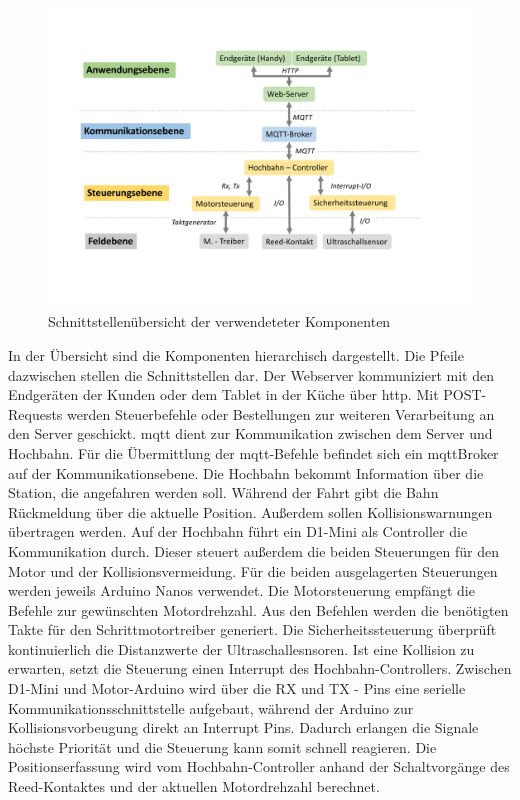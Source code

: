 \begin{figure}[h]
	\centering
	\includegraphics[width=17cm]{schnittstellen.pdf}
	\caption{Schnittstellenübersicht der verwendeteter Komponenten}
	\label{pic:schnittstellen}
\end{figure}


In der Übersicht sind die Komponenten hierarchisch dargestellt. Die Pfeile dazwischen stellen die Schnittstellen dar. Der Webserver kommuniziert mit den Endgeräten der Kunden oder dem Tablet in der Küche über \acrshort{http}. Mit POST-Requests werden Steuerbefehle oder Bestellungen zur weiteren Verarbeitung an den Server geschickt.
\acrshort{mqtt} dient zur Kommunikation zwischen dem Server und Hochbahn. Für die Übermittlung der \acrshort{mqtt}-Befehle  befindet sich ein \acrshort{mqttBroker} auf der Kommunikationsebene. Die Hochbahn bekommt Information über die Station, die angefahren werden soll. Während der Fahrt gibt die Bahn Rückmeldung über die aktuelle Position. Außerdem sollen Kollisionswarnungen übertragen werden. Auf der Hochbahn führt ein D1-Mini als Controller die Kommunikation durch. Dieser steuert außerdem die beiden Steuerungen für den Motor und der Kollisionsvermeidung. Für die beiden ausgelagerten Steuerungen werden jeweils Arduino Nanos verwendet. Die Motorsteuerung empfängt die Befehle zur gewünschten Motordrehzahl. Aus den Befehlen werden die benötigten Takte für den Schrittmotortreiber generiert. Die Sicherheitssteuerung überprüft kontinuierlich die Distanzwerte der Ultraschallesnsoren. Ist eine Kollision zu erwarten, setzt die Steuerung einen Interrupt des Hochbahn-Controllers. Zwischen D1-Mini und Motor-Arduino wird über die RX und TX - Pins eine serielle Kommunikationsschnittstelle aufgebaut, während der Arduino zur Kollisionsvorbeugung direkt an Interrupt Pins. Dadurch erlangen die Signale höchste Priorität und die Steuerung kann somit schnell reagieren. Die Positionserfassung wird vom Hochbahn-Controller anhand der Schaltvorgänge des Reed-Kontaktes und der aktuellen Motordrehzahl berechnet. \newpage

